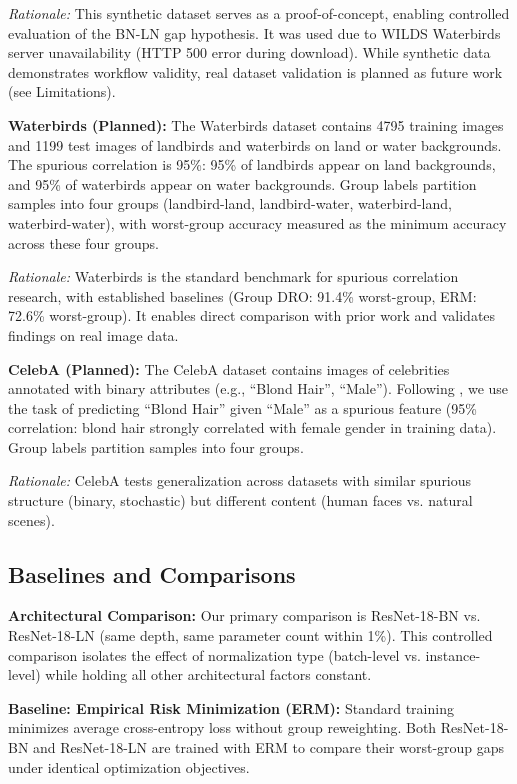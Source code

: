 \emph{Rationale:} This synthetic dataset serves as a proof-of-concept, enabling controlled evaluation of the BN-LN gap hypothesis. It was used due to WILDS Waterbirds server unavailability (HTTP 500 error during download). While synthetic data demonstrates workflow validity, real dataset validation is planned as future work (see Limitations).

\textbf{Waterbirds (Planned):}
The Waterbirds dataset \cite{sagawa2020distributionally} contains 4795 training images and 1199 test images of landbirds and waterbirds on land or water backgrounds. The spurious correlation is 95\%: 95\% of landbirds appear on land backgrounds, and 95\% of waterbirds appear on water backgrounds. Group labels partition samples into four groups (landbird-land, landbird-water, waterbird-land, waterbird-water), with worst-group accuracy measured as the minimum accuracy across these four groups.

\emph{Rationale:} Waterbirds is the standard benchmark for spurious correlation research, with established baselines (Group DRO: 91.4\% worst-group, ERM: 72.6\% worst-group). It enables direct comparison with prior work and validates findings on real image data.

\textbf{CelebA (Planned):}
The CelebA dataset \cite{liu2015deep} contains images of celebrities annotated with binary attributes (e.g., ``Blond Hair'', ``Male''). Following \cite{sagawa2020distributionally}, we use the task of predicting ``Blond Hair'' given ``Male'' as a spurious feature (95\% correlation: blond hair strongly correlated with female gender in training data). Group labels partition samples into four groups.

\emph{Rationale:} CelebA tests generalization across datasets with similar spurious structure (binary, stochastic) but different content (human faces vs. natural scenes).

\subsection{Baselines and Comparisons}

\textbf{Architectural Comparison:}
Our primary comparison is ResNet-18-BN vs. ResNet-18-LN (same depth, same parameter count within 1\%). This controlled comparison isolates the effect of normalization type (batch-level vs. instance-level) while holding all other architectural factors constant.

\textbf{Baseline: Empirical Risk Minimization (ERM):}
Standard training minimizes average cross-entropy loss without group reweighting. Both ResNet-18-BN and ResNet-18-LN are trained with ERM to compare their worst-group gaps under identical optimization objectives.

